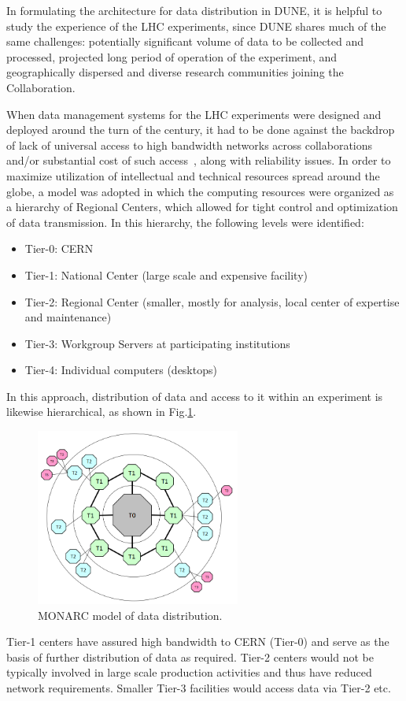 In formulating the architecture for data distribution in DUNE, it is helpful to study the experience of the LHC experiments,
since DUNE shares much of the same challenges: potentially significant  volume of data to be collected and processed,
projected long period of operation of the experiment, and geographically dispersed and diverse research communities joining the Collaboration.

When data management systems for the LHC experiments were designed and deployed around the turn of the century, it had to be done
against the backdrop of lack of universal access to high bandwidth networks across collaborations and/or substantial cost of such access~\cite{monarc},
along with reliability issues.
In order to maximize utilization of intellectual and technical resources spread around the globe, a model was adopted in which the computing resources
were organized as a hierarchy of Regional Centers, which allowed for tight control and optimization of data transmission. In this hierarchy, the following
levels were identified:
\begin{itemize}
\item Tier-0: CERN
\item Tier-1: National Center (large scale and expensive facility)
\item Tier-2: Regional Center (smaller, mostly for analysis, local center of expertise and maintenance)
\item Tier-3: Workgroup Servers at participating institutions
\item Tier-4: Individual computers (desktops)
\end{itemize}
\noindent
In this approach, distribution of data and access to it within an experiment is likewise hierarchical, as shown in Fig.\ref{fig:monarc}.
\begin{figure}[h!]
\centering
\includegraphics[width=0.6\textwidth]{monarc-model.png}
\caption{MONARC model of data distribution.}
\label{fig:monarc}
\end{figure}
Tier-1 centers have assured high bandwidth to CERN (Tier-0) and serve as the basis of further distribution of data
as required. Tier-2 centers would not be typically involved in large scale production activities and thus have reduced
network requirements. Smaller Tier-3 facilities would access data via Tier-2 etc.

